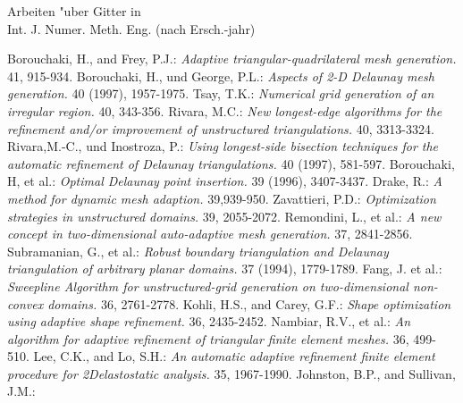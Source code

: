 \documentclass[12pt,a4paper]{article}
\begin{document}
\bc Arbeiten "uber Gitter in\\
    Int. J. Numer. Meth. Eng. (nach Ersch.-jahr)
\ec
%
%
%
\begin{thebibliography}{\hspace{5mm}}
%
 Borouchaki, H., and Frey, P.J.: {\sl Adaptive
triangular-quadrilateral mesh generation.}
41, 915-934.
%
 Borouchaki, H., und George, P.L.:  {\sl Aspects of 2-D
Delaunay mesh generation.}
40 (1997), 1957-1975.
%
 Tsay, T.K.: {\sl Numerical grid generation of an irregular
region.}
40, 343-356.
%
 Rivara, M.C.: {\sl New longest-edge algorithms for the
refinement and/or improvement of unstructured triangulations.}
40, 3313-3324.
%
 Rivara,M.-C., und Inostroza, P.: {\sl
Using longest-side bisection techniques for the automatic refinement of
Delaunay triangulations.}
40 (1997), 581-597.
%
 Borouchaki, H, et al.:
{\sl Optimal Delaunay point insertion.}
39 (1996), 3407-3437.
%
 Drake, R.: {\sl A method for dynamic mesh adaption.}
39,939-950.
%
 Zavattieri, P.D.: {\sl Optimization strategies
in unstructured domains.}
39, 2055-2072.
%
 Remondini, L., et al.: {\sl A new concept in
two-dimensional auto-adaptive mesh generation.}
37, 2841-2856.
%
 Subramanian, G., et al.: {\sl Robust boundary triangulation
and Delaunay triangulation of arbitrary planar domains.}
37 (1994), 1779-1789.
%
 Fang, J. et al.: {\sl Sweepline Algorithm for
unstructured-grid  generation on two-dimensional non-convex domains.}
36, 2761-2778.
%
 Kohli, H.S., and Carey, G.F.: {\sl Shape optimization using
adaptive shape refinement.}
36, 2435-2452.
%
 Nambiar, R.V., et al.: {\sl An algorithm for adaptive
refinement of triangular finite element meshes.}
36, 499-510.
%
 Lee, C.K., and Lo, S.H.:  {\sl An automatic adaptive
refinement finite element procedure for 2Delastostatic analysis.}
35, 1967-1990.
%
 Johnston, B.P., and Sullivan, J.M.: {\sl
}
\end{thebibliography}
\end{document}
